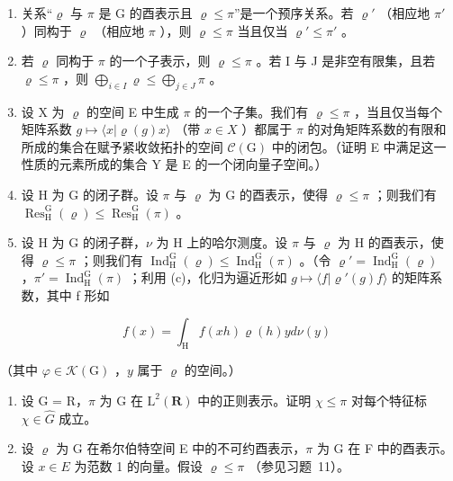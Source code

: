 \begin{enumerate}
\def\labelenumi{\alph{enumi})}
\item
  关系“\(\varrho\) 与 \(\pi\) 是 G 的酉表示且 \(\varrho \leqslant \pi\)”是一个预序关系。若 \(\varrho'\) （相应地 \(\pi'\) ）同构于 \(\varrho\) （相应地 \(\pi\) ），则 \(\varrho \leqslant \pi\) 当且仅当 \(\varrho' \leqslant \pi'\) 。
\item
  若 \(\varrho\) 同构于 \(\pi\) 的一个子表示，则 \(\varrho \leqslant \pi\) 。若 I 与 J 是非空有限集，且若 \(\varrho \leqslant \pi\) ，则 \(\bigoplus_{i \in I} \varrho \leqslant \bigoplus_{j \in J} \pi\) 。
\item
  设 X 为 \(\varrho\) 的空间 E 中生成 \(\pi\) 的一个子集。我们有 \(\varrho \leqslant \pi\) ，当且仅当每个矩阵系数 \(g \mapsto \langle x | \varrho(g)x \rangle\) （带 \(x \in X\) ）都属于 \(\pi\) 的对角矩阵系数的有限和所成的集合在赋予紧收敛拓扑的空间 \(\mathcal{C}(\mathrm{G})\) 中的闭包。（证明 E 中满足这一性质的元素所成的集合 Y 是 E 的一个闭向量子空间。）
\item
  设 H 为 G 的闭子群。设 \(\pi\) 与 \(\varrho\) 为 G 的酉表示，使得 \(\varrho \leqslant \pi\) ；则我们有 \(\operatorname{Res}_{\mathrm{H}}^{\mathrm{G}}(\varrho) \leqslant \operatorname{Res}_{\mathrm{H}}^{\mathrm{G}}(\pi)\) 。
\item
  设 H 为 G 的闭子群，\(\nu\) 为 H 上的哈尔测度。设 \(\pi\) 与 \(\varrho\) 为 H 的酉表示，使得 \(\varrho \leqslant \pi\) ；则我们有 \(\operatorname{Ind}_{\mathrm{H}}^{\mathrm{G}}(\varrho) \leqslant \operatorname{Ind}_{\mathrm{H}}^{\mathrm{G}}(\pi)\) 。（令 \(\varrho' = \operatorname{Ind}_{\mathrm{H}}^{\mathrm{G}}(\varrho)\) ，\(\pi' = \operatorname{Ind}_{\mathrm{H}}^{\mathrm{G}}(\pi)\) ；利用 (c)，化归为逼近形如 \(g \mapsto \langle f | \varrho'(g)f \rangle\) 的矩阵系数，其中 f 形如
\end{enumerate}

\[
f (x) = \int_ {\mathrm{H}} f (x h) \varrho (h) y d \nu (y)
\]

（其中 \(\varphi\in\mathcal{K}(\mathrm{G})\) ，\(y\) 属于 \(\varrho\) 的空间。）

\begin{enumerate}
\def\labelenumi{\arabic{enumi})}
\setcounter{enumi}{11}
\item
  设 G = R，\(\pi\) 为 G 在 \(\mathrm{L}^{2}(\mathbf{R})\) 中的正则表示。证明 \(\chi \leqslant \pi\) 对每个特征标 \(\chi \in \widehat{G}\) 成立。
\item
  设 \(\varrho\) 为 G 在希尔伯特空间 E 中的不可约酉表示，\(\pi\) 为 G 在 F 中的酉表示。设 \(x \in E\) 为范数 1 的向量。假设 \(\varrho \leqslant \pi\) （参见习题~11）。
\end{enumerate}

